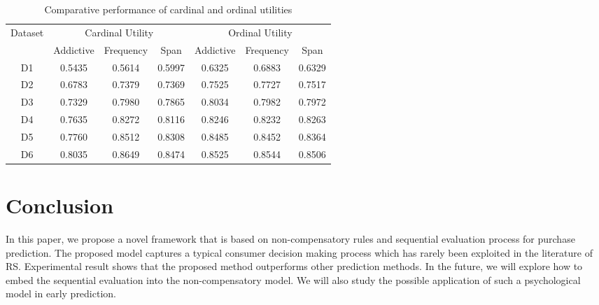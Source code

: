 \documentclass[sigconf]{acmart}
\begin{document}
\begin{table}[htbp]
\caption{Comparative performance of cardinal and ordinal utilities}
\label{tab:utility}
\begin{tabular}{|c|c|c|c|c|c|c|}
\hline
{Dataset} & \multicolumn{3}{|c|}{Cardinal Utility} & \multicolumn{3}{|c|}{Ordinal Utility} \\
 &  Addictive & Frequency & Span & Addictive  & Frequency &Span \\\hline
D1 & 0.5435	& 0.5614	& 0.5997	& 0.6325	& 0.6883	& 0.6329\\\hline
D2 & 0.6783& 	0.7379	& 0.7369	& 0.7525	& 0.7727	& 0.7517\\\hline
D3 & 0.7329& 	0.7980& 	0.7865& 	0.8034& 	0.7982& 	0.7972\\\hline
D4 & 0.7635	& 0.8272& 	0.8116& 	0.8246& 	0.8232	& 0.8263\\\hline
D5 & 0.7760& 	0.8512& 	0.8308& 	0.8485	& 0.8452& 	0.8364\\\hline
D6 & 0.8035& 	0.8649	& 0.8474	& 0.8525	& 0.8544& 	0.8506
\\ \hline \end{tabular}
\end{table}


\section{Conclusion}\label{sec:conclusion}
In this paper, we propose a novel framework that is based on non-compensatory rules and sequential evaluation process for purchase prediction. The proposed model captures a typical consumer decision making process which has rarely been exploited in the literature of RS. Experimental result shows that the proposed method outperforms other prediction methods. In the future, we will explore how to embed the sequential evaluation into the non-compensatory model. We will also study the possible application of such a psychological model in early prediction.



\end{document}
